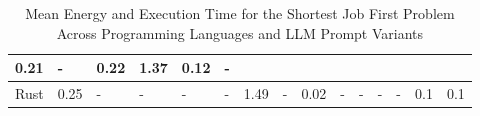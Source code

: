 \begin{table}[]
{\begin{tabular}{|l|lllllll|lllllll|}
  \multicolumn{1}{l|}{{\color[HTML]{666666} 0.21}} &
  \multicolumn{1}{l|}{{\color[HTML]{666666} -}} &
  \multicolumn{1}{l|}{{\color[HTML]{666666} 0.22}} &
  \multicolumn{1}{l|}{{\color[HTML]{666666} 1.37}} &
  \multicolumn{1}{l|}{{\color[HTML]{666666} 0.12}} &
  {\color[HTML]{666666} -} \\ \hline
{\color[HTML]{666666} Rust} &
  \multicolumn{1}{l|}{{\color[HTML]{666666} 0.25}} &
  \multicolumn{1}{l|}{{\color[HTML]{666666} -}} &
  \multicolumn{1}{l|}{{\color[HTML]{666666} -}} &
  \multicolumn{1}{l|}{{\color[HTML]{666666} -}} &
  \multicolumn{1}{l|}{{\color[HTML]{666666} -}} &
  \multicolumn{1}{l|}{{\color[HTML]{666666} 1.49}} &
  {\color[HTML]{666666} -} &
  \multicolumn{1}{l|}{{\color[HTML]{666666} 0.02}} &
  \multicolumn{1}{l|}{{\color[HTML]{666666} -}} &
  \multicolumn{1}{l|}{{\color[HTML]{666666} -}} &
  \multicolumn{1}{l|}{{\color[HTML]{666666} -}} &
  \multicolumn{1}{l|}{{\color[HTML]{666666} -}} &
  \multicolumn{1}{l|}{{\color[HTML]{666666} 0.1}} &
  {\color[HTML]{666666} 0.1} \\ \hline
\end{tabular}%
}
\centering
\caption{Mean Energy and Execution Time for the Shortest Job First Problem Across Programming Languages and LLM Prompt Variants}
\end{table}